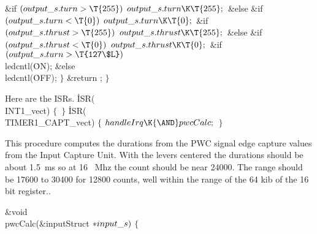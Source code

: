 \Y\B\&{if} ${}(\\{output\_s}.\\{turn}>\T{255}){}$\1\5
${}\\{output\_s}.\\{turn}\K\T{255};{}$\2\6
\&{else} \&{if} ${}(\\{output\_s}.\\{turn}<\T{0}){}$\1\5
${}\\{output\_s}.\\{turn}\K\T{0};{}$\2\6
\&{if} ${}(\\{output\_s}.\\{thrust}>\T{255}){}$\1\5
${}\\{output\_s}.\\{thrust}\K\T{255};{}$\2\6
\&{else} \&{if} ${}(\\{output\_s}.\\{thrust}<\T{0}){}$\1\5
${}\\{output\_s}.\\{thrust}\K\T{0};{}$\2\6
\&{if} ${}(\\{output\_s}.\\{turn}>\T{127\$L}){}$\1\5
\\{ledcntl}(\.{ON});\2\6
\&{else}\1\5
\\{ledcntl}(\.{OFF});\2\7
$\}{}$\7
\&{return} ;\7
$\}{}$\par
\fi

Here are the ISRs.
\Y\B\.{ISR}(\\{INT1\_vect})\1\1\2\2\6
${}\{{}$\7
\,${}\}{}$\7
\.{ISR}(\\{TIMER1\_CAPT\_vect})\1\1\2\2\6
${}\{{}$\1\7
${}\\{handleIrq}\K{\AND}\\{pwcCalc};{}$\6
\4${}\}{}$\2\par
\fi

This procedure computes the durations from the PWC signal edge capture values
from the Input Capture Unit.
With the levers centered the durations should be about 1.5~ms so at 16~ Mhz
the count should be near 24000.
The range should be 17600 to 30400 for 12800 counts, well within the range
of the 64 kib of the 16 bit register..


\Y\B\&{void} \\{pwcCalc}(\&{inputStruct} ${}{*}\\{input\_s}){}$\1\1 $\{{}$\Y\par
\fi


